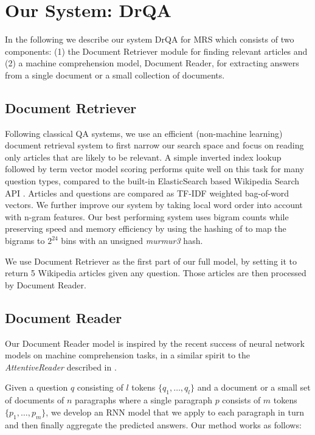 \documentclass[11pt,a4paper]{article}
\newcommand\us{DrQA\xspace}
\newcommand\usr{Document Retriever\xspace}
\newcommand\usp{Document Reader\xspace}
\begin{document}
\section{Our System: \us} \label{sec:model}

In the following we describe our system \us for MRS which consists of two components: (1) the Document Retriever module for finding relevant articles and (2) a machine comprehension model, \usp, for extracting answers from a single document or a small collection of documents.
\subsection{\usr} \label{sec:irmodel}
Following classical QA systems, we use an efficient (non-machine learning) document retrieval system to first narrow our search space and focus on reading only articles that are likely to be relevant. A simple inverted index lookup followed by term vector model scoring performs quite well on this task for many question types, compared to the built-in ElasticSearch based Wikipedia Search API \cite{gormley2015elasticsearch}. Articles and questions are compared as TF-IDF weighted bag-of-word vectors.
We further improve our system by taking local word order into account with n-gram features. Our best performing system uses bigram counts while preserving speed and memory efficiency by using the hashing of \cite{weinberger2009feature} to map the bigrams to $2^{24}$ bins with an unsigned \emph{murmur3} hash.

We use \usr as the first part of our full model, by setting it to return 5 Wikipedia articles given any question. Those articles are then processed by \usp.


\subsection{Document Reader}
Our \usp model is inspired by the recent success of neural network models on machine comprehension tasks, in a similar spirit to the \emph{AttentiveReader} described in \cite{nips2015hermann,chen2016thorough}.



Given a question $q$ consisting of $l$ tokens $\{q_1, \ldots, q_l\}$ and a
document or a small set of documents of $n$ paragraphs where a single paragraph $p$ consists of $m$ tokens $\{p_1, \ldots, p_m\}$,  we develop an RNN model that we apply to each paragraph in turn and then finally aggregate the predicted answers. Our method works as follows:
\end{document}
